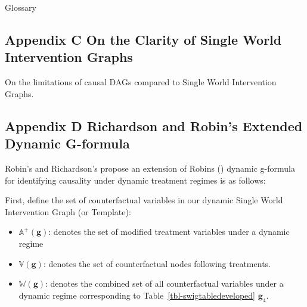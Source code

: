 \documentclass[
  single column]{article}
\providecommand{\tightlist}{%
  \setlength{\itemsep}{0pt}\setlength{\parskip}{0pt}}\usepackage{longtable,booktabs,array}
\begin{document}
\begin{table}

\caption{\label{tbl-gloassary}Glossary}

\centering{

\glossaryTerms

}

\end{table}%

\subsection{Appendix C On the Clarity of Single World Intervention
Graphs}\label{appendix-c-on-the-clarity-of-single-world-intervention-graphs}

\newpage{}

\begin{table}

\caption{\label{tbl-pearltable}On the limitations of causal DAGs
compared to Single World Intervention Graphs.}

\centering{

\pearltable

}

\end{table}%

\subsection{Appendix D Richardson and Robin's Extended Dynamic
G-formula}\label{appendix-d-richardson-and-robins-extended-dynamic-g-formula}

Robin's and Richardson's propose an extension of Robins
() dynamic g-formula for identifying
causality under dynamic treatment regimes is as follows:

First, define the set of counterfactual variables in our dynamic Single
World Intervention Graph (or Template):

\begin{itemize}
\tightlist
\item
  \(\mathbb{A}^+(\mathbf{g})\): denotes the set of modified treatment
  variables under a dynamic regime
\item
  \(\mathbb{V}(\mathbf{g})\): denotes the set of counterfactual nodes
  following treatments.
\item
  \(\mathbb{W}(\mathbf{g})\): denotes the combined set of all
  counterfactual variables under a dynamic regime corresponding to
  Table~\ref{tbl-swigtabledeveloped} \(\mathbf{g}_4\).
\end{itemize}
\end{document}
